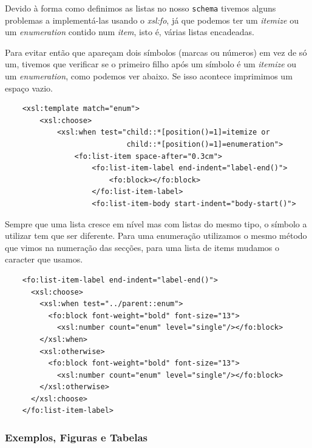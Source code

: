 \documentclass[a4paper]{article}
\begin{document}
\hspace{1cm}Devido à forma como definimos as listas no nosso \verb|schema| tivemos alguns problemas a implementá-las usando o {\em xsl:fo}, já que podemos ter um {\em itemize} ou um {\em enumeration} contido num {\em item}, isto é, várias listas encadeadas.

\hspace{1cm}Para evitar então que apareçam dois símbolos (marcas ou números) em vez de só um, tivemos que verificar se o primeiro filho após um símbolo é um {\em itemize} ou um {\em enumeration}, como podemos ver abaixo. Se isso acontece imprimimos um espaço vazio.\\

\begin{small}
\begin{lstlisting}
    <xsl:template match="enum">
        <xsl:choose>
            <xsl:when test="child::*[position()=1]=itemize or 
                            child::*[position()=1]=enumeration">
                <fo:list-item space-after="0.3cm">
                    <fo:list-item-label end-indent="label-end()">
                        <fo:block></fo:block>
                    </fo:list-item-label>
                    <fo:list-item-body start-indent="body-start()">
\end{lstlisting}
\end{small}

\hspace{1cm}Sempre que uma lista cresce em nível mas com listas do mesmo tipo, o símbolo a utilizar tem que ser diferente. Para uma enumeração utilizamos o mesmo método que vimos na numeração das secções, para uma lista de items mudamos o caracter que usamos.\\

\begin{small}
\begin{lstlisting}
    <fo:list-item-label end-indent="label-end()">
      <xsl:choose> 
        <xsl:when test="../parent::enum">
          <fo:block font-weight="bold" font-size="13">
            <xsl:number count="enum" level="single"/></fo:block>
        </xsl:when>
        <xsl:otherwise>
          <fo:block font-weight="bold" font-size="13">
            <xsl:number count="enum" level="single"/></fo:block>
        </xsl:otherwise>
      </xsl:choose>
    </fo:list-item-label>
\end{lstlisting}
\end{small}

\subsubsection{Exemplos, Figuras e Tabelas}
\end{document}
